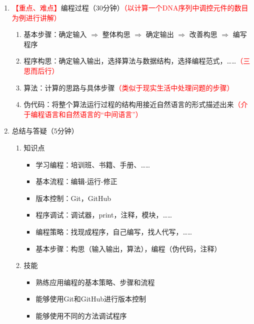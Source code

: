 \documentclass{TIJMUjiaoanLL}
\begin{document}
\begin{enumerate}
  \item \textcolor{red}{【重点、难点】}编程过程（30分钟）\textcolor{red}{（以计算一个DNA序列中调控元件的数目为例进行讲解）}
    \begin{enumerate}
      \item 基本步骤：确定输入 $\Rightarrow$ 整体构思 $\Rightarrow$ 确定输出 $\Rightarrow$ 改善构思 $\Rightarrow$ 编写程序
      \item 程序构思：确定输入输出，选择算法与数据结构，选择编程范式，……\textcolor{red}{（三思而后行）}
      \item 算法：计算的思路与具体步骤\textcolor{red}{（类似于现实生活中处理问题的步骤）}
      \item 伪代码：将整个算法运行过程的结构用接近自然语言的形式描述出来\textcolor{red}{（介于编程语言和自然语言的“中间语言”）}
\vspace*{-1em}
\vspace*{-1em}
    \end{enumerate}
  \item 总结与答疑（5分钟）
    \begin{enumerate}
      \item 知识点
	\begin{itemize}
	  \item 学习编程：培训班、书籍、手册、……
	  \item 基本流程：编辑-运行-修正
	  \item 版本控制：Git，GitHub
	  \item 程序调试：调试器，print，注释，模块，……
	  \item 编程策略：找现成程序，自己编写，找人代写，……
	  \item 基本步骤：构思（输入输出，算法），编程（伪代码，注释）
	\end{itemize}
      \item 技能
	\begin{itemize}
	  \item 熟练应用编程的基本策略、步骤和流程
	  \item 能够使用Git和GitHub进行版本控制
	  \item 能够使用不同的方法调试程序
	\end{itemize}
    \end{enumerate}
\end{enumerate}

\otherTail
\end{document}

